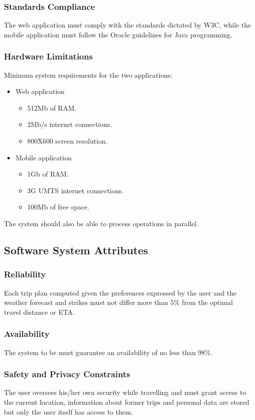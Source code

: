 \subsubsection{Standards Compliance}
The web application must comply with the standards dictated by W3C, while the mobile application must follow the Oracle guidelines for Java programming.
\subsubsection{Hardware Limitations}
\label{sec:HardwareLimitations}
Minimum system requirements for the two applications:
\begin{itemize}
\item Web application
\begin{itemize}
\item 512Mb of RAM.
\item 2Mb/s internet connections.
\item 800X600 screen resolution.
\end{itemize}
\item Mobile application
\begin{itemize}
\item 1Gb of RAM.
\item 3G UMTS internet connections.
\item 100Mb of free space.
\end{itemize}
\end{itemize}
The system should also be able to process operations in parallel.
\clearpage
\subsection{Software System Attributes}
\subsubsection{Reliability}
Each trip plan computed given the preferences expressed by the user and the weather forecast and strikes must not differ more than 5\% from the optimal travel distance or ETA.
\subsubsection{Availability}
The system to be must guarantee an availability of no less than 98\%.
\subsubsection{Safety and Privacy Constraints}
The user oversees his/her own security while travelling and must grant access to the current location, information about former trips and personal data are stored but only the user itself has access to them.
